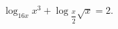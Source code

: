 \begin{ex}[type=equation]
	\begin{condition}
		$\log_{16x} x^3 + \log$\tiny$_{\dfrac{x}{2}}$\normalsize$\sqrt{x} = 2.$
	\end{condition}
\end{ex}